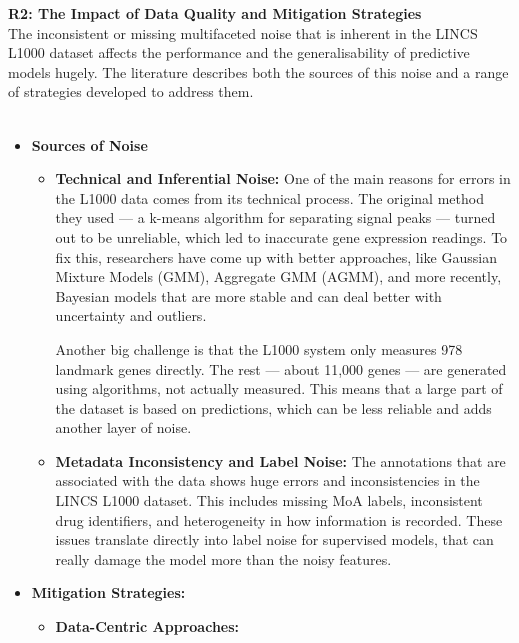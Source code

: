 \documentclass[twocolumn]{article}
\begin{document}
\textbf{R2: The Impact of Data Quality and Mitigation Strategies}
\\
The inconsistent or missing multifaceted noise that is inherent in the LINCS L1000 dataset affects the performance and the generalisability of predictive models hugely\cite{szalai2019signatures}. The literature describes both the sources of this noise and a range of strategies developed to address them.
\\
\\
\begin{itemize}
  \item \textbf{Sources of Noise}
    \begin{itemize}
            \item \textbf{Technical and Inferential Noise:}
            One of the main reasons for errors in the L1000 data comes from its technical process. The original method they used — a k-means algorithm for separating signal peaks — turned out to be unreliable, which led to inaccurate gene expression readings. To fix this, researchers have come up with better approaches, like Gaussian Mixture Models (GMM), Aggregate GMM (AGMM), and more recently, Bayesian models that are more stable and can deal better with uncertainty and outliers\cite{qiu2020bayesian}.
        
            Another big challenge is that the L1000 system only measures 978 landmark genes directly. The rest — about 11,000 genes — are generated using algorithms, not actually measured. This means that a large part of the dataset is based on predictions, which can be less reliable and adds another layer of noise\cite{subramanian2017next,mcdermott2019deep}.
            \item \textbf{Metadata Inconsistency and Label Noise: }
            The annotations that are associated with the data shows huge errors and inconsistencies in the LINCS L1000 dataset. This includes missing MoA labels, inconsistent drug identifiers, and heterogeneity in how information is recorded. These issues translate directly into label noise for supervised models, that can really damage the model more than the noisy features\cite{szalai2019signatures}. 
            \end{itemize}
        \item \textbf{Mitigation Strategies:}
    
            \begin{itemize}
            \item \textbf{Data-Centric Approaches:}
            

\end{itemize}
\end{itemize}
\end{document}
